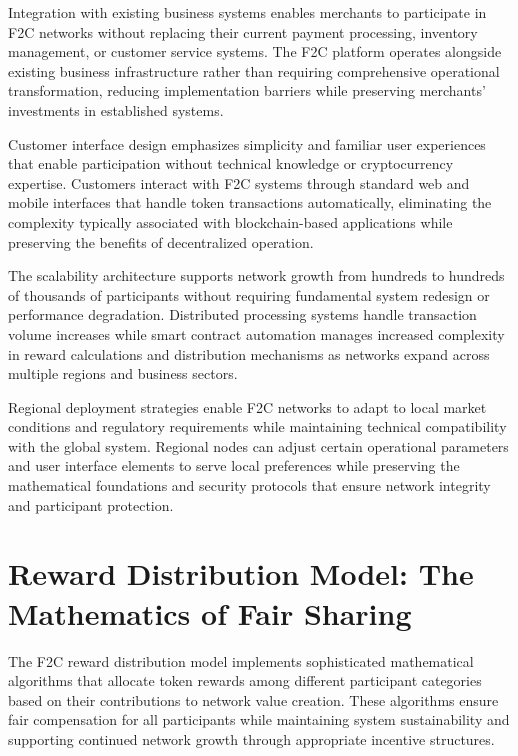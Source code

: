 \documentclass[
  Letterpaper,
]{scrbook}
\begin{document}
Integration with existing business systems enables merchants to
participate in F2C networks without replacing their current payment
processing, inventory management, or customer service systems. The F2C
platform operates alongside existing business infrastructure rather than
requiring comprehensive operational transformation, reducing
implementation barriers while preserving merchants' investments in
established systems.

Customer interface design emphasizes simplicity and familiar user
experiences that enable participation without technical knowledge or
cryptocurrency expertise. Customers interact with F2C systems through
standard web and mobile interfaces that handle token transactions
automatically, eliminating the complexity typically associated with
blockchain-based applications while preserving the benefits of
decentralized operation.

The scalability architecture supports network growth from hundreds to
hundreds of thousands of participants without requiring fundamental
system redesign or performance degradation. Distributed processing
systems handle transaction volume increases while smart contract
automation manages increased complexity in reward calculations and
distribution mechanisms as networks expand across multiple regions and
business sectors.

Regional deployment strategies enable F2C networks to adapt to local
market conditions and regulatory requirements while maintaining
technical compatibility with the global system. Regional nodes can
adjust certain operational parameters and user interface elements to
serve local preferences while preserving the mathematical foundations
and security protocols that ensure network integrity and participant
protection.

\section{Reward Distribution Model: The Mathematics of Fair
Sharing}\label{reward-distribution-model-the-mathematics-of-fair-sharing}

The F2C reward distribution model implements sophisticated mathematical
algorithms that allocate token rewards among different participant
categories based on their contributions to network value creation. These
algorithms ensure fair compensation for all participants while
maintaining system sustainability and supporting continued network
growth through appropriate incentive structures.
\end{document}
